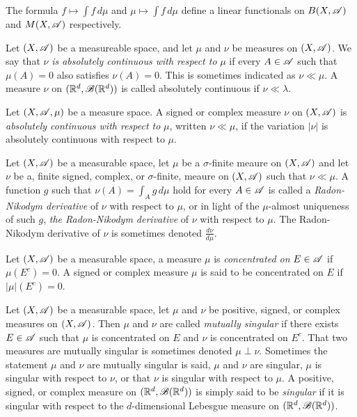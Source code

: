 \documentclass[12pt]{article}
\begin{document}
\begin{remark}
    The formula $f\mapsto \int f\,d\mu$ and $\mu\mapsto \int f\,d\mu$ define a linear functionals on $B(X,\mathscr{A})$ and $M(X,\mathscr{A})$ respectively.
\end{remark}
\begin{definition}
    Let $(X,\mathscr{A})$ be a measureable space, and let $\mu$ and $\nu$ be measures on $(X,\mathscr{A})$. We say that $\nu$ \textit{is absolutely continuous with respect to} $\mu$ if every $A\in \mathscr{A}$ such that $\mu(A)=0$ also satisfies $\nu(A)=0$. This is sometimes indicated as $\nu\ll\mu$. A measure $\nu$ on $(\mathbb{R}^d,\mathscr{B}(\mathbb{R}^d))$ is called absolutely continuous if $\nu\ll\lambda$.
\end{definition}
\begin{definition}
    Let $(X,\mathscr{A},\mu)$ be a measure space. A signed or complex measure $\nu$ on $(X,\mathscr{A})$ is \textit{absolutely continuous with respect to} $\mu$, written $\nu\ll\mu$, if the variation $|\nu|$ is absolutely continuous with respect to $\mu$.
\end{definition}
\begin{definition}
    Let $(X,\mathscr{A})$ be a measurable space, let $\mu$ be a $\sigma$-finite meaure on $(X,\mathscr{A})$ and let $\nu$ be a, finite signed, complex, or $\sigma$-finite, meaure on $(X,\mathscr{A})$ such that $\nu\ll\mu$. A function $g$ such that $\nu(A)=\int_Ag\,d\mu$ hold for every $A\in\mathscr{A}$ is called a \textit{Radon-Nikodym derivative} of $\nu$ with respect to $\mu$, or in light of the $\mu$-almost uniqueness of such $g$, \textit{the Radon-Nikodym derivative} of $\nu$ with respect to $\mu$. The Radon-Nikodym derivative of $\nu$ is sometimes denoted $\frac{d\nu}{d\mu}$.
\end{definition}
\begin{definition}
    Let $(X,\mathscr{A})$ be a measurable space, a measure $\mu$ is \textit{concentrated on} $E\in\mathscr{A}$ if $\mu(E^c)=0$. A signed or complex measure $\mu$ is said to be concentrated on $E$ if $|\mu|(E^c)=0$.
\end{definition}
\begin{definition}[Singularity]
    Let $(X,\mathscr{A})$ be a measurable space, let $\mu$ and $\nu$ be positive, signed, or complex measures on $(X,\mathscr{A})$. Then $\mu$ and $\nu$ are called \textit{mutually singular} if there exists $E\in\mathscr{A}$ such that $\mu$ is concentrated on $E$ and $\nu$ is concentrated on $E^c$. That two measures are mutually singular is sometimes denoted $\mu\perp\nu$. Sometimes the statement $\mu$ and $\nu$ are mutually singular is said, $\mu$ and $\nu$ are singular, $\mu$ is singular with respect to $\nu$, or that $\nu$ is singular with respect to $\mu$. A positive, signed, or complex measure on $(\mathbb{R}^d,\mathscr{B}(\mathbb{R}^d))$ is simply said to be \textit{singular} if it is singular with respect to the $d$-dimensional Lebesgue measure on $(\mathbb{R}^d,\mathscr{B}(\mathbb{R}^d))$.
\end{definition}
\end{document}
